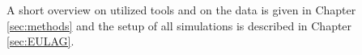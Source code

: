 A short overview on utilized tools and on the data is given in Chapter \ref{sec:methods} and the setup of all simulations is described in Chapter \ref{sec:EULAG}.
















